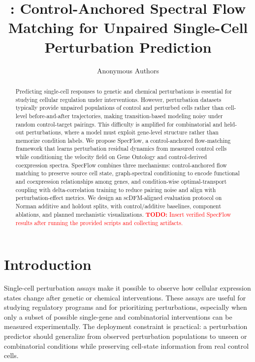\documentclass[11pt]{article}
\title{\method{}: Control-Anchored Spectral Flow Matching for Unpaired Single-Cell Perturbation Prediction}
\author{Anonymous Authors}
\date{}
\newcommand{\method}{SpecFlow}
\newcommand{\todo}[1]{\textcolor{red}{\textbf{TODO:} #1}}
\DeclareRobustCommand{\code}[1]{\texttt{\detokenize{#1}}}
\begin{document}
\maketitle

\begin{abstract}
Predicting single-cell responses to genetic and chemical perturbations is essential for studying cellular regulation under interventions.
However, perturbation datasets typically provide unpaired populations of control and perturbed cells rather than cell-level before-and-after trajectories, making transition-based modeling noisy under random control-target pairings.
This difficulty is amplified for combinatorial and held-out perturbations, where a model must exploit gene-level structure rather than memorize condition labels.
We propose \method{}, a control-anchored flow-matching framework that learns perturbation residual dynamics from measured control cells while conditioning the velocity field on Gene Ontology and control-derived coexpression spectra.
\method{} combines three mechanisms: control-anchored flow matching to preserve source cell state, graph-spectral conditioning to encode functional and coexpression relationships among genes, and condition-wise optimal-transport coupling with delta-correlation training to reduce pairing noise and align with perturbation-effect metrics.
We design an scDFM-aligned evaluation protocol on Norman additive and holdout splits, with control/additive baselines, component ablations, and planned mechanistic visualizations.
\todo{Insert verified \method{} results after running the provided scripts and collecting \code{agg\_results.csv} artifacts.}
\end{abstract}

\section{Introduction}

Single-cell perturbation assays make it possible to observe how cellular expression states change after genetic or chemical interventions.
These assays are useful for studying regulatory programs and for prioritizing perturbations, especially when only a subset of possible single-gene and combinatorial interventions can be measured experimentally.
The deployment constraint is practical: a perturbation predictor should generalize from observed perturbation populations to unseen or combinatorial conditions while preserving cell-state information from real control cells.
\end{document}
